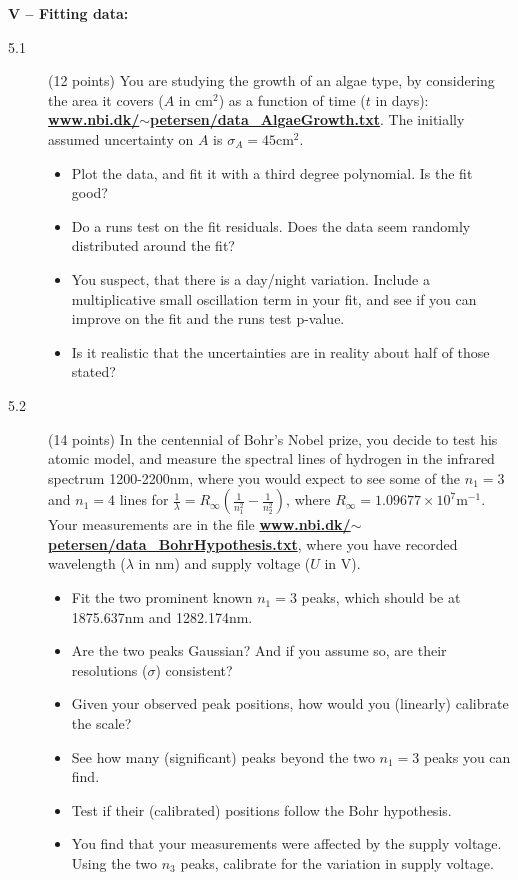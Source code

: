 \documentclass[11pt]{article}
\begin{document}

\noindent
{\bf V -- Fitting data:}
\begin{description}
\item[5.1] (12 points)
  You are studying the growth of an algae type, by considering the area it covers ($A$ in $\mbox{cm}^2$)
  as a function of time ($t$ in days):
  \href{http://www.nbi.dk/~petersen/data\_AlgaeGrowth.txt}{\bf www.nbi.dk/$\sim$petersen/data\_AlgaeGrowth.txt}.
  The initially assumed uncertainty on $A$ is $\sigma_A = 45 \mbox{cm}^2$.
  \vspace{-1.0ex}
  \begin{itemize}
    \item Plot the data, and fit it with a third degree polynomial. Is the fit good?
    \item Do a runs test on the fit residuals. Does the data seem randomly distributed around the fit?
    \item You suspect, that there is a day/night variation. Include a multiplicative small oscillation term in
      your fit, and see if you can improve on the fit and the runs test p-value.
    \item Is it realistic that the uncertainties are in reality about half of those stated?
  \end{itemize}
%
\item[5.2] (14 points)
  In the centennial of Bohr's Nobel prize, you decide to test his atomic model, and measure the spectral
  lines of hydrogen in the infrared spectrum 1200-2200nm, where you would expect to see some of the
  $n_1 = 3$ and $n_1 = 4$ lines for $\frac{1}{\lambda} = R_{\infty} \left( \frac{1}{n_1^2} - \frac{1}{n_2^2} \right)$,
  where $R_{\infty} = 1.09677 \times 10^7 \mbox{m}^{-1}$.
  Your measurements are in the file \href{http://www.nbi.dk/~petersen/data\_BohrHypothesis.txt}{\bf www.nbi.dk/$\sim$petersen/data\_BohrHypothesis.txt}, where you have recorded wavelength ($\lambda$ in nm) and supply voltage ($U$ in V).
  \vspace*{-1ex}
  \begin{itemize}
    \item Fit the two prominent known $n_1 = 3$ peaks, which should be at 1875.637nm and 1282.174nm.
    \item Are the two peaks Gaussian? And if you assume so, are their resolutions ($\sigma$) consistent?
    \item Given your observed peak positions, how would you (linearly) calibrate the scale?
    \item See how many (significant) peaks beyond the two $n_1 = 3$ peaks you can find.
    \item Test if their (calibrated) positions follow the Bohr hypothesis.
    \item You find that your measurements were affected by the supply voltage. Using the two $n_3$ peaks,
      calibrate for the variation in supply voltage.
  \end{itemize}
\vspace*{-2ex}
\end{description}
\end{document}

